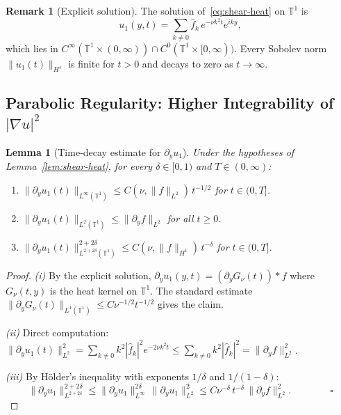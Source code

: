 \documentclass[11pt]{article}
\newtheorem{lemma}[theorem]{Lemma}
\theoremstyle{definition}
\newtheorem{remark}[theorem]{Remark}
\theoremstyle{remark}
\newcommand{\T}{\mathbb{T}}
\begin{document}
\begin{remark}[Explicit solution]
  The solution of~\eqref{eq:shear-heat} on $\T^1$ is
  \[
    u_1(y,t) = \sum_{k\neq 0}\hat f_k\,e^{-\nu k^2 t}e^{iky},
  \]
  which lies in $C^\infty(\T^1\times(0,\infty))\cap C^0(\T^1\times[0,\infty))$.
  Every Sobolev norm $\|u_1(t)\|_{H^s}$ is finite for $t>0$ and decays
  to zero as $t\to\infty$.
\end{remark}

\subsection{Parabolic Regularity: Higher Integrability of $|\nabla u|^2$}
\label{sec:shear-regularity}

\begin{lemma}[Time-decay estimate for $\partial_y u_1$]
\label{lem:shear-decay}
  Under the hypotheses of Lemma~\ref{lem:shear-heat}, for every
  $\delta\in[0,1)$ and $T\in(0,\infty)$:
  \begin{enumerate}[label=(\roman*)]
  \item $\|\partial_y u_1(t)\|_{L^\infty(\T^1)} \leq
        C(\nu,\|f\|_{L^2})\,t^{-1/2}$ for $t\in(0,T]$.
  \item $\|\partial_y u_1(t)\|_{L^2(\T^1)} \leq \|\partial_y f\|_{L^2}$
        for all $t\geq 0$.
  \item $\|\partial_y u_1(t)\|_{L^{2+2\delta}(\T^1)}^{2+2\delta}
        \leq C(\nu,\|f\|_{H^1})\,t^{-\delta}$ for $t\in(0,T]$.
  \end{enumerate}
\end{lemma}

\begin{proof}
  \emph{(i)} By the explicit solution,
  $\partial_y u_1(y,t) = (\partial_y G_\nu(t))*f$
  where $G_\nu(t,y)$ is the heat kernel on $\T^1$.  The standard estimate
  $\|\partial_y G_\nu(t)\|_{L^1(\T^1)}\leq C\nu^{-1/2}t^{-1/2}$ gives the claim.

  \emph{(ii)} Direct computation:
  $\|\partial_y u_1(t)\|_{L^2}^2 = \sum_{k\neq0}k^2|\hat f_k|^2e^{-2\nu k^2 t}
  \leq \sum_{k\neq0}k^2|\hat f_k|^2 = \|\partial_y f\|_{L^2}^2$.

  \emph{(iii)} By H\"older's inequality with exponents $1/\delta$ and
  $1/(1-\delta)$:
  \[
    \|\partial_y u_1\|_{L^{2+2\delta}}^{2+2\delta}
    \leq \|\partial_y u_1\|_{L^\infty}^{2\delta}\,
         \|\partial_y u_1\|_{L^2}^{2}
    \leq C\nu^{-\delta}\,t^{-\delta}\,\|\partial_y f\|_{L^2}^2.
    \qquad\qquad\square
  \]
\end{proof}
\end{document}
